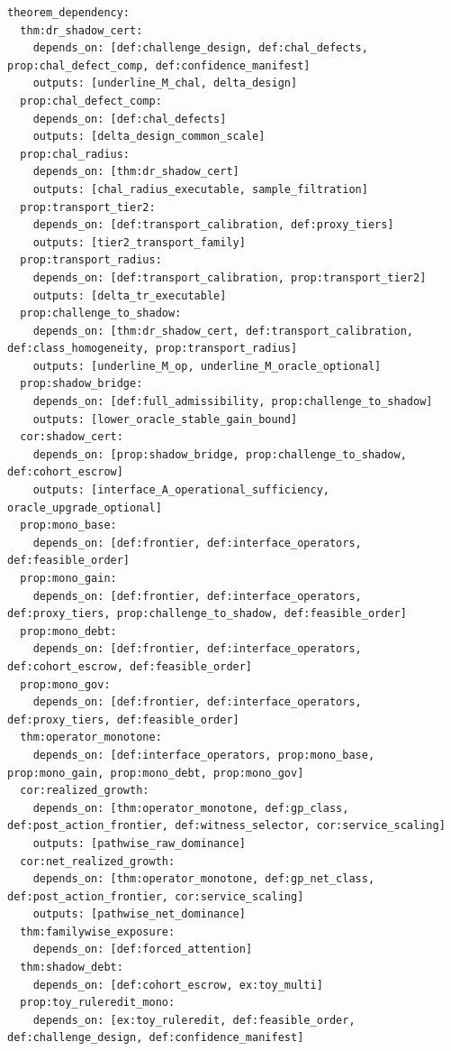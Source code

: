 \documentclass[11pt]{article}
\theoremstyle{definition}
\newcommand{\1}{\mathbf{1}}
\begin{document}
{\begin{verbatim}
theorem_dependency:
  thm:dr_shadow_cert:
    depends_on: [def:challenge_design, def:chal_defects, prop:chal_defect_comp, def:confidence_manifest]
    outputs: [underline_M_chal, delta_design]
  prop:chal_defect_comp:
    depends_on: [def:chal_defects]
    outputs: [delta_design_common_scale]
  prop:chal_radius:
    depends_on: [thm:dr_shadow_cert]
    outputs: [chal_radius_executable, sample_filtration]
  prop:transport_tier2:
    depends_on: [def:transport_calibration, def:proxy_tiers]
    outputs: [tier2_transport_family]
  prop:transport_radius:
    depends_on: [def:transport_calibration, prop:transport_tier2]
    outputs: [delta_tr_executable]
  prop:challenge_to_shadow:
    depends_on: [thm:dr_shadow_cert, def:transport_calibration, def:class_homogeneity, prop:transport_radius]
    outputs: [underline_M_op, underline_M_oracle_optional]
  prop:shadow_bridge:
    depends_on: [def:full_admissibility, prop:challenge_to_shadow]
    outputs: [lower_oracle_stable_gain_bound]
  cor:shadow_cert:
    depends_on: [prop:shadow_bridge, prop:challenge_to_shadow, def:cohort_escrow]
    outputs: [interface_A_operational_sufficiency, oracle_upgrade_optional]
  prop:mono_base:
    depends_on: [def:frontier, def:interface_operators, def:feasible_order]
  prop:mono_gain:
    depends_on: [def:frontier, def:interface_operators, def:proxy_tiers, prop:challenge_to_shadow, def:feasible_order]
  prop:mono_debt:
    depends_on: [def:frontier, def:interface_operators, def:cohort_escrow, def:feasible_order]
  prop:mono_gov:
    depends_on: [def:frontier, def:interface_operators, def:proxy_tiers, def:feasible_order]
  thm:operator_monotone:
    depends_on: [def:interface_operators, prop:mono_base, prop:mono_gain, prop:mono_debt, prop:mono_gov]
  cor:realized_growth:
    depends_on: [thm:operator_monotone, def:gp_class, def:post_action_frontier, def:witness_selector, cor:service_scaling]
    outputs: [pathwise_raw_dominance]
  cor:net_realized_growth:
    depends_on: [thm:operator_monotone, def:gp_net_class, def:post_action_frontier, cor:service_scaling]
    outputs: [pathwise_net_dominance]
  thm:familywise_exposure:
    depends_on: [def:forced_attention]
  thm:shadow_debt:
    depends_on: [def:cohort_escrow, ex:toy_multi]
  prop:toy_ruleredit_mono:
    depends_on: [ex:toy_ruleredit, def:feasible_order, def:challenge_design, def:confidence_manifest]


\end{verbatim}}
\end{document}
